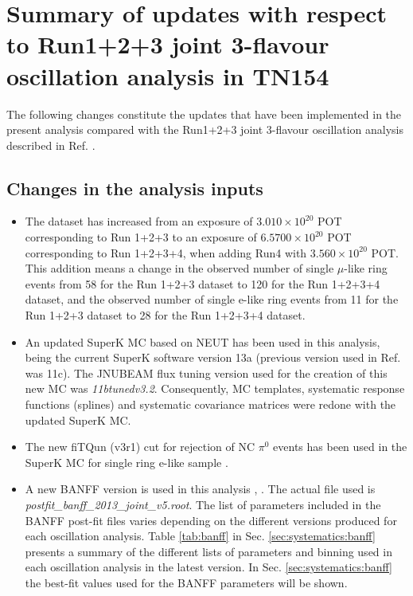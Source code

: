 
\section {Summary of updates with respect to Run1+2+3 joint 3-flavour oscillation analysis in TN154}
\label{sec:changes}

The following changes constitute the updates that have been implemented in the present analysis compared with the Run1+2+3 joint 3-flavour oscillation analysis described in Ref. \cite{OurJointAnalysis}.

\subsection{Changes in the analysis inputs}

\begin{itemize}

\item{The dataset has increased from an exposure of $3.010\times10^{20}$ POT corresponding to Run 1+2+3 to an exposure of $6.5700\times10^{20}$ POT corresponding to Run 1+2+3+4, when adding Run4 with $3.560\times10^{20}$ POT. This addition means a change in the observed number of single $\mu$-like ring events from 58 for the Run 1+2+3 dataset to 120 for the Run 1+2+3+4 dataset, and the observed number of single e-like ring events from 11 for the Run 1+2+3 dataset to 28 for the Run 1+2+3+4 dataset.}

\item{An updated SuperK MC based on NEUT has been used in this analysis, being the current SuperK software version 13a  (previous version used in Ref. \cite{OurJointAnalysis} was 11c). The JNUBEAM flux tuning version used for the creation of this new MC was \textit{11btunedv3.2}. Consequently, MC templates, systematic response functions (splines) and systematic covariance matrices were redone with the updated SuperK MC. }

\item{The new fiTQun (v3r1) cut for rejection of NC $\pi^{0}$ events has been used in the SuperK MC for single ring e-like sample \cite{fiTQun}.}

\item{A new BANFF version is used in this analysis \cite{ND280Inputs}, \cite{BANFF2013}. The actual file used is \textit{postfit\_banff\_2013\_joint\_v5.root}. The list of parameters included in the BANFF post-fit files varies depending on the different versions produced for each oscillation analysis. Table \ref{tab:banff} in Sec. \ref{sec:systematics:banff} presents a summary of the different lists of parameters and binning used in each oscillation analysis in the latest version. In Sec. \ref{sec:systematics:banff} the best-fit values used for the BANFF parameters will be shown. }



\end{itemize}
